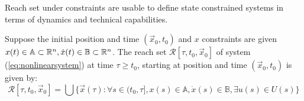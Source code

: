 \noindent Reach set under constraints are usable to define state constrained systems in terms of dynamics and technical capabilities.
\begin{definition}
Suppose the initial position
and time $(\vec{x}_0, t_0)$ and $x$ constraints are given $x(t) \in \mathbb{A} \subset \mathbb{R}^n, \dot{x}(t) \in \mathbb{B} \subset \mathbb{R}^n$. The reach set $\mathscr{R}[\tau, t_0, \vec{x}_0]$ of system (\ref{eq:nonlinearsystem}) at time $\tau \ge t_0$, starting at position and time $(\vec{x}_0, t_0)$ is given by:
\begin{equation}
    \mathscr{R}[\tau, t_0, \vec{x}_0] = \bigcup \{\vec{x}(\tau):\forall s\in (t_0,\tau], x(s) \in \mathbb{A}, \dot{x}(s) \in \mathbb{B}, \exists u(s) \in U(s)\}
\end{equation}
\end{definition}


